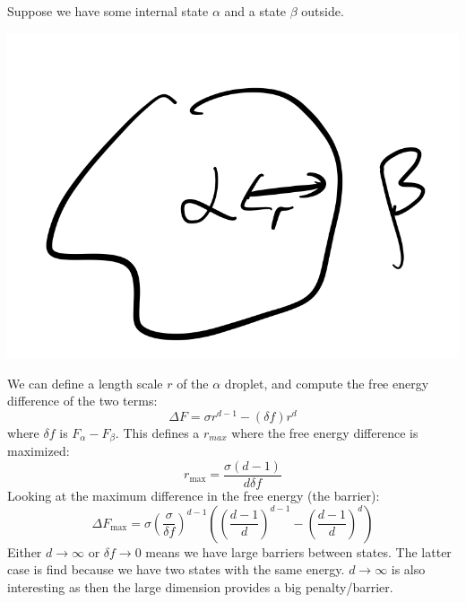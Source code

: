 Suppose we have some internal state $\alpha$ and a state $\beta$ outside.

\begin{center}
    \includegraphics[scale=0.3]{Lectures/Figures/lec13-statesize.png}
\end{center}

We can define a length scale $r$ of the $\alpha$ droplet, and compute the free energy difference of the two terms:
\begin{equation}
    \Delta F = \sigma r^{d-1} - (\delta f)r^d
\end{equation}
where $\delta f$ is $F_\alpha - F_\beta$. This defines a $r_{max}$ where the free energy difference is maximized:
\begin{equation}
    r_{\text{max}} = \frac{\sigma(d-1)}{d\delta f}
\end{equation}
Looking at the maximum difference in the free energy (the barrier):
\begin{equation}
    \Delta F_{\text{max}} = \sigma\left(\frac{\sigma}{\delta f}\right)^{d-1}\left(\left(\frac{d-1}{d}\right)^{d-1} - \left(\frac{d-1}{d}\right)^{d}\right)
\end{equation}
Either $d \to \infty$ or $\delta f \to 0$ means we have large barriers between states. The latter case is find because we have two states with the same energy. $d \to \infty$ is also interesting as then the large dimension provides a big penalty/barrier.

